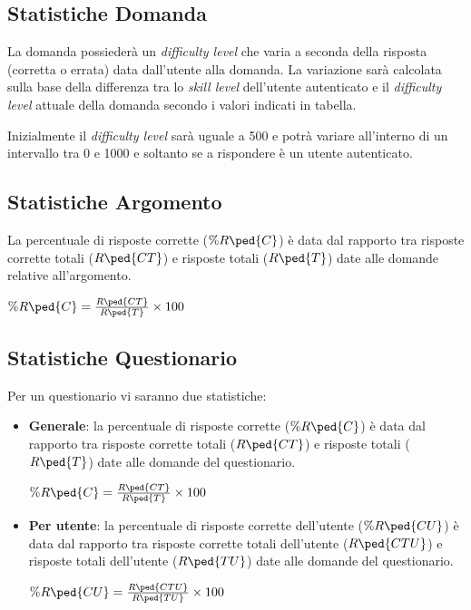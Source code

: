 \subsection{Statistiche Domanda}
La domanda possiederà un \textit{difficulty level} che varia a seconda della risposta (corretta o errata) data dall'utente alla domanda. La variazione sarà calcolata sulla base della differenza tra lo \textit{skill level} dell'utente autenticato e il \textit{difficulty level} attuale della domanda secondo i valori indicati in tabella.


Inizialmente il \textit{difficulty level} sarà uguale a 500 e potrà variare all'interno di un intervallo tra 0 e 1000 e soltanto se a rispondere è un utente autenticato.


\subsection{Statistiche Argomento}
La percentuale di risposte corrette ($\%R\ped{C}$) è data dal rapporto tra risposte corrette totali ($R\ped{CT}$) e risposte totali ($R\ped{T}$) date alle domande relative all'argomento.
\begin{center}
	$\%R\ped{C} = \frac{R\ped{CT}}{R\ped{T}}\times{100}$
\end{center}


\subsection{Statistiche Questionario}
Per un questionario vi saranno due statistiche:
\begin{itemize}
	\item \textbf{Generale}: la percentuale di risposte corrette ($\%R\ped{C}$) è data dal rapporto tra risposte corrette totali ($R\ped{CT}$) e risposte totali ($R\ped{T}$) date alle domande del questionario.
	\begin{center}
	$\%R\ped{C} = \frac{R\ped{CT}}{R\ped{T}}\times{100}$
	\end{center}
	\item \textbf{Per utente}: la percentuale di risposte corrette dell'utente ($\%R\ped{CU}$) è data dal rapporto tra risposte corrette totali dell'utente ($R\ped{CTU}$) e risposte totali dell'utente ($R\ped{TU}$) date alle domande del questionario.
	\begin{center}
	$\%R\ped{CU} = \frac{R\ped{CTU}}{R\ped{TU}}\times{100}$
	\end{center}
\end{itemize}

